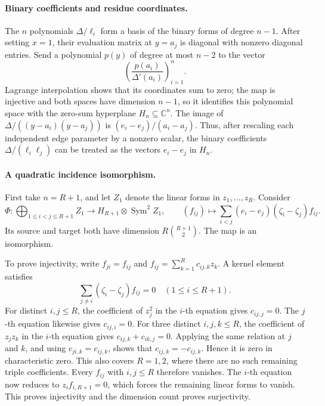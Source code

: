 \paragraph{Binary coefficients and residue coordinates.}
The $n$ polynomials $\Delta/\ell_i$ form a basis of the
binary forms of degree $n-1$. After setting $x=1$, their
evaluation matrix at $y=a_j$ is diagonal with nonzero
diagonal entries.
Send a polynomial $p(y)$ of degree
at most $n-2$ to the vector
\[
                \left(\frac{p(a_i)}{\Delta'(a_i)}\right)_{i=1}^n.
\]
Lagrange interpolation shows that its coordinates sum to
zero; the map is injective and both spaces have dimension
$n-1$, so it identifies this polynomial space with the
zero-sum hyperplane $H_n\subseteq\mathbb C^n$. The image of
$\Delta/((y-a_i)(y-a_j))$ is
$(e_i-e_j)/(a_i-a_j)$. Thus, after rescaling each independent
edge parameter by a nonzero scalar, the binary coefficients
$\Delta/(\ell_i\ell_j)$ can be treated as the vectors
$e_i-e_j$ in $H_n$.

\paragraph{A quadratic incidence isomorphism.}
First take $n=R+1$, and let $Z_1$ denote the linear forms
in $z_1,\ldots,z_R$. Consider
\[
 \Phi:\bigoplus_{1\leq i<j\leq R+1} Z_1
       \longrightarrow H_{R+1}\otimes\operatorname{Sym}^2Z_1,
 \qquad
 (f_{ij})\longmapsto
   \sum_{i<j}(e_i-e_j)(\zeta_i-\zeta_j)f_{ij}.
                                                               \tag{O-020.4}
\]
Its source and target both have dimension
$R\binom{R+1}{2}$. The map is an isomorphism.

To prove injectivity, write $f_{ji}=f_{ij}$ and
$f_{ij}=\sum_{k=1}^R c_{ij,k}z_k$. A kernel element satisfies
\[
          \sum_{j\neq i}(\zeta_i-\zeta_j)f_{ij}=0
                                  \quad(1\leq i\leq R+1).
\]
For distinct $i,j\leq R$, the coefficient of $z_j^2$
in the $i$-th equation gives $c_{ij,j}=0$.
The $j$-th equation likewise gives $c_{ij,i}=0$.
For three distinct $i,j,k\leq R$, the coefficient of
$z_jz_k$ in the $i$-th equation gives
$c_{ij,k}+c_{ik,j}=0$. Applying the same relation at
$j$ and $k$, and using $c_{ji,k}=c_{ij,k}$, shows that
$c_{ij,k}=-c_{ij,k}$. Hence it is zero in characteristic
zero. This also covers $R=1,2$, where there are no such
remaining triple coefficients. Every $f_{ij}$ with
$i,j\leq R$ therefore vanishes. The $i$-th equation now
reduces to $z_i f_{i,R+1}=0$, which forces the remaining
linear forms to vanish. This proves injectivity and the
dimension count proves surjectivity.

